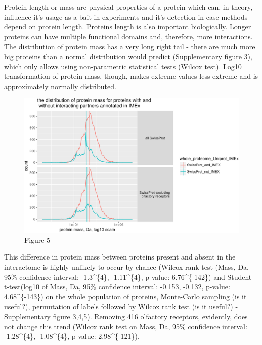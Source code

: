 \documentclass[]{article}
\begin{document}
Protein length or mass are physical properties of a protein which can,
in theory, influence it's usage as a bait in experiments and it's
detection in case methods depend on protein length. Proteins length is
also important biologically. Longer proteins can have multiple
functional domains and, therefore, more interactions. The distribution
of protein mass has a very long right tail - there are much more big
proteins than a normal distribution would predict (Supplementary figure
3), which only allows using non-parametric statistical tests (Wilcox
test). Log10 transformation of protein mass, though, makes extreme
values less extreme and is approximately normally distributed.

\begin{figure}[htbp]
\centering
\includegraphics{final_report_files/figure-latex/human_not_in_IMEx_proteins_are_shorter_density-1.pdf}
\caption{Figure 5}
\end{figure}

This difference in protein mass between proteins present and absent in
the interactome is highly unlikely to occur by chance (Wilcox rank test
(Mass, Da, 95\% confidence interval: -1.3\^{}\{4\},
-1.11\^{}\{4\}, p-value: 6.76\^{}\{-142\}) and Student
t-test(log10 of Mass, Da, 95\% confidence interval: -0.153, -0.132,
p-value: 4.68\^{}\{-143\}) on the whole population of proteins,
Monte-Carlo sampling (is it useful?), permutation of labels followed by
Wilcox rank test (is it useful?) - Supplementary figure 3,4,5). Removing
416 olfactory receptors, evidently, does not change this trend (Wilcox
rank test on Mass, Da, 95\% confidence interval:
-1.28\^{}\{4\}, -1.08\^{}\{4\}, p-value:
2.98\^{}\{-121\}).
\end{document}
